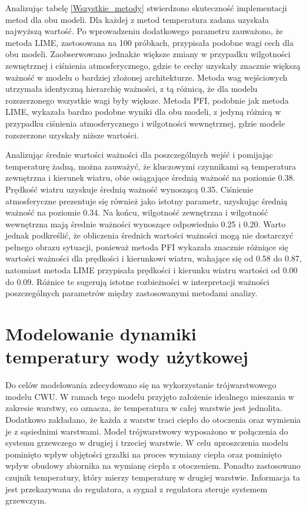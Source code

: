 \documentclass[a4paper,twoside,12pt]{book}
\begin{document}
Analizując tabelę \ref{Wszystkie_metody} stwierdzono skuteczność implementacji metod dla obu modeli. Dla każdej z metod temperatura zadana uzyskała najwyższą wartość. Po wprowadzeniu dodatkowego parametru zauważono, że metoda LIME, zastosowana na 100 próbkach, przypisała podobne wagi cech dla obu modeli. Zaobserwowano jednakże większe zmiany w przypadku wilgotności zewnętrznej i ciśnienia atmosferycznego, gdzie te cechy uzyskały znacznie większą ważność w modelu o bardziej złożonej architekturze. Metoda wag wejściowych utrzymała identyczną hierarchię ważności, z tą różnicą, że dla modelu rozszerzonego wszystkie wagi były większe. Metoda PFI, podobnie jak metoda LIME, wykazała bardzo podobne wyniki dla obu modeli, z jedyną różnicą w przypadku ciśnienia atmosferycznego i wilgotności wewnętrznej, gdzie modele rozszerzone uzyskały niższe wartości.

Analizując średnie wartości ważności dla poszczególnych wejść i pomijając temperaturę żadną, można zauważyć, że kluczowymi czynnikami są temperatura zewnętrzna i kierunek wiatru, obie osiągające średnią ważność na poziomie 0.38. Prędkość wiatru uzyskuje średnią ważność wynoszącą 0.35. Ciśnienie atmosferyczne prezentuje się również jako istotny parametr, uzyskując średnią ważność na poziomie 0.34. Na końcu, wilgotność zewnętrzna i wilgotność wewnętrzna mają średnie ważności wynoszące odpowiednio 0.25 i 0.20. Warto jednak podkreślić, że obliczenia średnich wartości ważności mogą nie dostarczyć pełnego obrazu sytuacji, ponieważ metoda PFI wykazała znacznie różniące się wartości ważności dla prędkości i kierunkowi wiatru, wahające się od 0.58 do 0.87, natomiast metoda LIME przypisała prędkości i kierunku wiatru wartości od 0.00 do 0.09. Różnice te sugerują istotne rozbieżności w interpretacji ważności poszczególnych parametrów między zastosowanymi metodami analizy.


\chapter{Modelowanie dynamiki temperatury wody użytkowej}
\label{ch:05}
Do celów modelowania zdecydowano się na wykorzystanie trójwarstwowego modelu CWU. W ramach tego modelu przyjęto założenie idealnego mieszania w zakresie warstwy, co oznacza, że temperatura w całej warstwie jest jednolita. Dodatkowo zakładano, że każda z warstw traci ciepło do otoczenia oraz wymienia je z sąsiednimi warstwami. Model trójwarstwowy wyposażono w połączenia do systemu grzewczego w drugiej i trzeciej warstwie. W celu uproszczenia modelu  pominięto wpływ objętości grzałki na proces wymiany ciepła oraz pominięto wpływ obudowy zbiornika na wymianę ciepła z otoczeniem. Ponadto zastosowano czujnik temperatury, który mierzy temperaturę w drugiej warstwie. Informacja ta jest przekazywana do regulatora, a sygnał z regulatora steruje systemem grzewczym.\\
\end{document}
